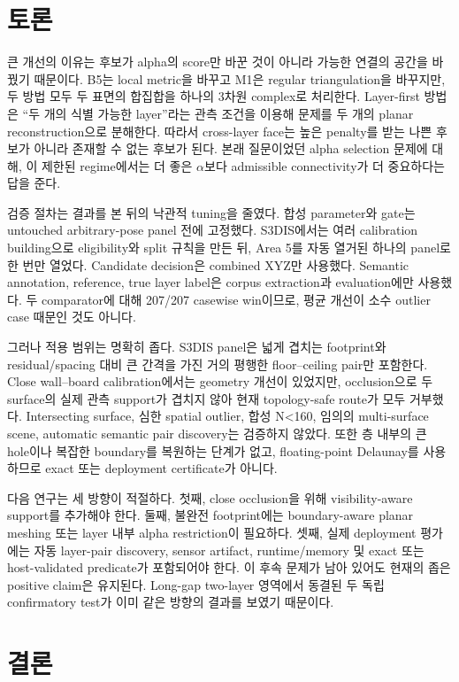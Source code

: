 \documentclass[12pt,a4paper]{article}
\begin{document}
\section{토론}

큰 개선의 이유는 후보가 alpha의 score만 바꾼 것이 아니라 가능한 연결의
공간을 바꿨기 때문이다. B5는 local metric을 바꾸고 M1은 regular
triangulation을 바꾸지만, 두 방법 모두 두 표면의 합집합을 하나의 3차원
complex로 처리한다. Layer-first 방법은 ``두 개의 식별 가능한 layer''라는
관측 조건을 이용해 문제를 두 개의 planar reconstruction으로 분해한다.
따라서 cross-layer face는 높은 penalty를 받는 나쁜 후보가 아니라 존재할 수
없는 후보가 된다. 본래 질문이었던 alpha selection 문제에 대해, 이 제한된
regime에서는 더 좋은 $\alpha$보다 admissible connectivity가 더 중요하다는
답을 준다.

검증 절차는 결과를 본 뒤의 낙관적 tuning을 줄였다. 합성 parameter와 gate는
untouched arbitrary-pose panel 전에 고정했다. S3DIS에서는 여러 calibration
building으로 eligibility와 split 규칙을 만든 뒤, Area 5를 자동 열거된 하나의
panel로 한 번만 열었다. Candidate decision은 combined XYZ만 사용했다.
Semantic annotation, reference, true layer label은 corpus extraction과
evaluation에만 사용했다. 두 comparator에 대해 207/207 casewise win이므로,
평균 개선이 소수 outlier case 때문인 것도 아니다.

그러나 적용 범위는 명확히 좁다. S3DIS panel은 넓게 겹치는 footprint와
residual/spacing 대비 큰 간격을 가진 거의 평행한 floor--ceiling pair만
포함한다. Close wall--board calibration에서는 geometry 개선이 있었지만,
occlusion으로 두 surface의 실제 관측 support가 겹치지 않아 현재 topology-safe
route가 모두 거부했다. Intersecting surface, 심한 spatial outlier, 합성 N<160,
임의의 multi-surface scene, automatic semantic pair discovery는 검증하지 않았다.
또한 층 내부의 큰 hole이나 복잡한 boundary를 복원하는 단계가 없고,
floating-point Delaunay를 사용하므로 exact 또는 deployment certificate가
아니다.

다음 연구는 세 방향이 적절하다. 첫째, close occlusion을 위해 visibility-aware
support를 추가해야 한다. 둘째, 불완전 footprint에는 boundary-aware planar
meshing 또는 layer 내부 alpha restriction이 필요하다. 셋째, 실제 deployment
평가에는 자동 layer-pair discovery, sensor artifact, runtime/memory 및 exact
또는 host-validated predicate가 포함되어야 한다. 이 후속 문제가 남아 있어도
현재의 좁은 positive claim은 유지된다. Long-gap two-layer 영역에서 동결된
두 독립 confirmatory test가 이미 같은 방향의 결과를 보였기 때문이다.

\section{결론}
\end{document}

